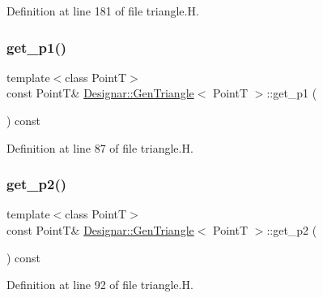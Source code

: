 Definition at line 181 of file triangle.\+H.

\mbox{\label{class_designar_1_1_gen_triangle_ab697f342f213f563049c9f74fcee06a1}} 
\subsubsection{\texorpdfstring{get\+\_\+p1()}{get\_p1()}}
{\footnotesize\ttfamily template$<$class PointT$>$ \\
const PointT\& \hyperlink{class_designar_1_1_gen_triangle}{Designar\+::\+Gen\+Triangle}$<$ PointT $>$\+::get\+\_\+p1 (\begin{DoxyParamCaption}{ }\end{DoxyParamCaption}) const\hspace{0.3cm}{\ttfamily [inline]}}



Definition at line 87 of file triangle.\+H.

\mbox{\label{class_designar_1_1_gen_triangle_a77a549a6f5c67ab61298395606f920fa}} 
\subsubsection{\texorpdfstring{get\+\_\+p2()}{get\_p2()}}
{\footnotesize\ttfamily template$<$class PointT$>$ \\
const PointT\& \hyperlink{class_designar_1_1_gen_triangle}{Designar\+::\+Gen\+Triangle}$<$ PointT $>$\+::get\+\_\+p2 (\begin{DoxyParamCaption}{ }\end{DoxyParamCaption}) const\hspace{0.3cm}{\ttfamily [inline]}}



Definition at line 92 of file triangle.\+H.

\mbox{\label{class_designar_1_1_gen_triangle_a56dbe16bc096232f2bcc6f95c2e464df}} 
